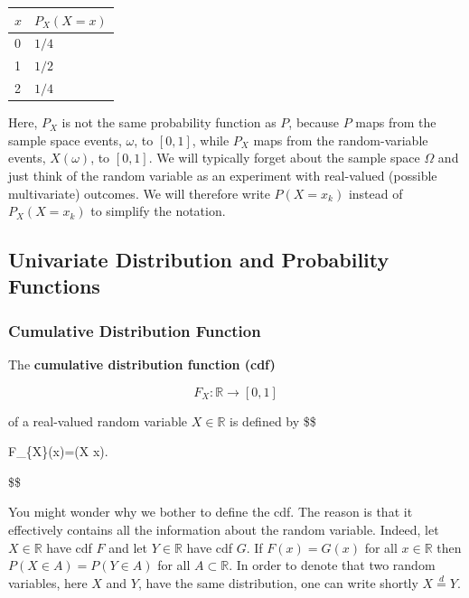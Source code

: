 \documentclass[
  letterpaper,
  DIV=11,
  numbers=noendperiod]{scrreprt}
\theoremstyle{definition}
\theoremstyle{plain}
\theoremstyle{plain}
\theoremstyle{remark}
\begin{document}
\begin{longtable}[]{@{}ll@{}}
\toprule()
\(x\) & \(P_X(X=x)\) \\
\midrule()
\endhead
0 & \(1 / 4\) \\
1 & \(1 / 2\) \\
2 & \(1 / 4\) \\
\bottomrule()
\end{longtable}

Here, \(P_{X}\) is not the same probability function as \(P\), because
\(P\) maps from the sample space events, \(\omega\), to \([0,1]\), while
\(P_X\) maps from the random-variable events, \(X(\omega)\), to
\([0,1]\). We will typically forget about the sample space \(\Omega\)
and just think of the random variable as an experiment with real-valued
(possible multivariate) outcomes. We will therefore write
\(P\left(X=x_{k}\right)\) instead of \(P_{X}\left(X=x_{k}\right)\) to
simplify the notation.

\hypertarget{univariate-distribution-and-probability-functions}{%
\subsection{Univariate Distribution and Probability
Functions}\label{univariate-distribution-and-probability-functions}}

\hypertarget{cumulative-distribution-function}{%
\subsubsection{Cumulative Distribution
Function}\label{cumulative-distribution-function}}

The \textbf{cumulative distribution function (cdf)}

\[F_{X}: \mathbb{R} \rightarrow [0,1]\]

of a real-valued random variable \(X\in\mathbb{R}\) is defined by \$\$

F\_\{X\}(x)=(X \leq x).

\$\$

You might wonder why we bother to define the cdf. The reason is that it
effectively contains all the information about the random variable.
Indeed, let \(X\in\mathbb{R}\) have cdf \(F\) and let \(Y\in\mathbb{R}\)
have cdf \(G\). If \(F(x)=G(x)\) for all \(x\in\mathbb{R}\) then
\(P(X \in A)=P(Y \in A)\) for all \(A\subset\mathbb{R}\). In order to
denote that two random variables, here \(X\) and \(Y\), have the same
distribution, one can write shortly \(X\overset{d}{=}Y\).
\end{document}
